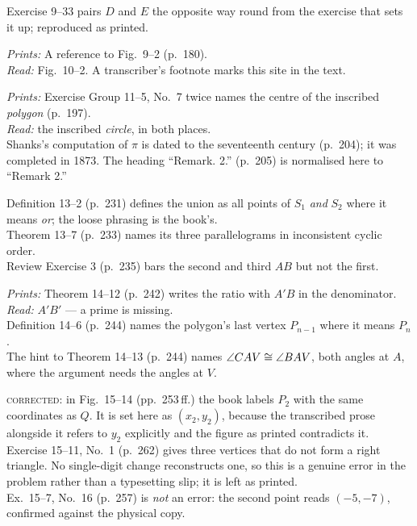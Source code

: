 \documentclass[11pt]{book}
\newcommand{\ERprints}[1]{\emph{Prints:} #1}
\newcommand{\ERmeans}[1]{\emph{Read:} #1}
\begin{document}
\begin{erratalist}
\item[Chapter 9 \quad Similarity of triangles and polygons]
Exercise 9--33 pairs $D$ and $E$ the opposite way round from the exercise
that sets it up; reproduced as printed.

\item[Chapter 10 \quad Area]
\ERprints{A reference to Fig.~9--2 (p.~180).}\\
\ERmeans{Fig.~10--2.} A transcriber's footnote marks this site in the text.

\item[Chapter 11 \quad Circles and regular polygons]
\ERprints{Exercise Group 11--5, No.~7 twice names the centre of the inscribed
\emph{polygon} (p.~197).}\\
\ERmeans{the inscribed \emph{circle}, in both places.}\\
Shanks's computation of $\pi$ is dated to the seventeenth century (p.~204);
it was completed in 1873. The heading ``Remark. 2.'' (p.~205) is normalised
here to ``Remark 2.''

\item[Chapter 13 \quad Loci and sets]
Definition 13--2 (p.~231) defines the union as all points of $S_1$
\emph{and} $S_2$ where it means \emph{or}; the loose phrasing is the book's.\\
Theorem 13--7 (p.~233) names its three parallelograms in inconsistent cyclic
order.\\
Review Exercise 3 (p.~235) bars the second and third $AB$ but not the first.

\item[Chapter 14 \quad Space geometry]
\ERprints{Theorem 14--12 (p.~242) writes the ratio with $A'B$ in the
denominator.}\\
\ERmeans{$A'B'$ --- a prime is missing.}\\
Definition 14--6 (p.~244) names the polygon's last vertex $P_{n-1}$ where it
means $P_n$.\\
The hint to Theorem 14--13 (p.~244) names $\angle CAV \cong \angle BAV$, both
angles at $A$, where the argument needs the angles at $V$.

\item[Chapter 15 \quad Analytic geometry]
\textsc{corrected}: in Fig.~15--14 (pp.~253\,ff.) the book labels $P_2$ with
the same coordinates as $Q$. It is set here as $(x_2, y_2)$, because the
transcribed prose alongside it refers to $y_2$ explicitly and the figure as
printed contradicts it.\\
Exercise 15--11, No.~1 (p.~262) gives three vertices that do not form a right
triangle. No single-digit change reconstructs one, so this is a genuine error
in the problem rather than a typesetting slip; it is left as printed.\\
Ex.~15--7, No.~16 (p.~257) is \emph{not} an error: the second point reads
$(-5, -7)$, confirmed against the physical copy.


\end{erratalist}
\end{document}
